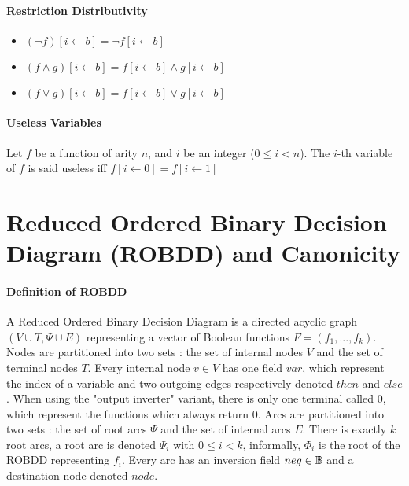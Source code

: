 \documentclass[a4paper,10pt]{article}
\begin{document}
\paragraph{Restriction Distributivity\\}

\begin{itemize}
\item $(\lnot f)[i\leftarrow b] = \lnot f[i\leftarrow b]$
\item $(f\land g)[i\leftarrow b] = f[i\leftarrow b] \land g[i\leftarrow b]$
\item $(f\lor g)[i\leftarrow b] = f[i\leftarrow b] \lor g[i\leftarrow b]$
\end{itemize}

\paragraph{Useless Variables\\}

Let $f$ be a function of arity $n$, and $i$ be an integer ($0\leq i < n$).
The $i$-th variable of $f$ is said useless iff $f[i\leftarrow 0] = f[i\leftarrow 1]$

\section{Reduced Ordered Binary Decision Diagram (ROBDD) and Canonicity}

\paragraph{Definition of ROBDD\\}

A Reduced Ordered Binary Decision Diagram is a directed acyclic graph $(V\cup T, \Psi \cup E)$ representing a vector of Boolean functions $F=(f_1, ..., f_k)$.
Nodes are partitioned into two sets : the set of internal nodes $V$ and the set of terminal nodes $T$.
Every internal node $v\in V$ has one field $var$, which represent the index of a variable and two outgoing edges respectively denoted $then$ and $else$.
When using the "output inverter" variant, there is only one terminal called 0, which represent the functions which always return 0.
Arcs are partitioned into two sets : the set of root arcs $\Psi$ and the set of internal arcs $E$.
There is exactly $k$ root arcs, a root arc is denoted $\Psi_i$ with $0\leq i < k$, informally, $\Phi_i$ is the root of the ROBDD representing $f_i$.
Every arc has an inversion field $neg \in \mathbb{B}$ and a destination node denoted $node$.
\end{document}
